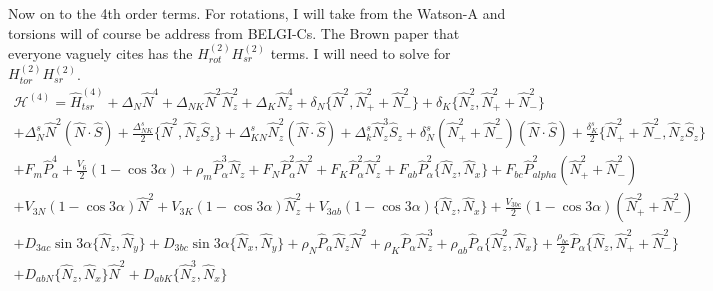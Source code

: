 \documentclass{article}
\begin{document}
Now on to the 4th order terms. 
For rotations, I will take from the Watson-A and torsions will of course be address from BELGI-Cs. 
The Brown paper that everyone vaguely cites has the $H_{rot}^{(2)}H_{sr}^{(2)}$ terms. 
I will need to solve for $H_{tor}^{(2)}H_{sr}^{(2)}$.\vspace{12pt}
\begin{multline}
\mathscr{H}^{(4)} = \hat{H}_{tsr}^{(4)} + \Delta_{N}\hat{N}^{4} + \Delta_{NK}\hat{N}^{2}\hat{N}_{z}^{2} + \Delta_{K}\hat{N}_{z}^{4} 
+ \delta_{N}\{\hat{N}^{2},\hat{N}_{+}^{2}+\hat{N}_{-}^{2}\}+ \delta_{K}\{\hat{N}_{z}^{2},\hat{N}_{+}^{2}+\hat{N}_{-}^{2}\}\\
+ \Delta^{s}_{N}\hat{N}^{2}(\hat{N}\cdot\hat{S}) + \frac{\Delta_{NK}^{s}}{2}\{\hat{N}^{2},\hat{N}_{z}\hat{S}_{z}\} + \Delta_{KN}^{s}\hat{N}_{z}^{2}(\hat{N}\cdot\hat{S}) 
+ \Delta_{k}^{s}\hat{N}^{3}_{z}\hat{S}_{z} + \delta^{s}_{N}(\hat{N}_{+}^{2}+\hat{N}_{-}^{2})(\hat{N}\cdot\hat{S})
+ \frac{\delta^{s}_{K}}{2}\{\hat{N}_{+}^{2}+\hat{N}_{-}^{2},\hat{N}_{z}\hat{S}_{z}\} \\
+ F_{m}\hat{P}_{\alpha}^{4} + \frac{V_{6}}{2}(1-\cos3\alpha) + \rho_{m}\hat{P}_{\alpha}^{3}\hat{N}_{z}
+ F_{N}\hat{P}_{\alpha}^{2}\hat{N}^{2}  
+ F_{K}\hat{P}_{\alpha}^{2}\hat{N}_{z}^{2} + F_{ab}\hat{P}^{2}_{\alpha}\{\hat{N}_{z},\hat{N}_{x}\} + F_{bc}\hat{P}_{alpha}^{2}(\hat{N}_{+}^{2}+\hat{N}_{-}^{2})\\
+ V_{3N}(1-\cos3\alpha)\hat{N}^{2} + V_{3K}(1-\cos3\alpha)\hat{N}_{z}^{2} 
+ V_{3ab}(1-\cos3\alpha)\{\hat{N}_{z},\hat{N}_{x}\} +  \frac{V_{3bc}}{2}(1-\cos3\alpha)(\hat{N}_{+}^{2}+\hat{N}_{-}^{2}) \\
+ D_{3ac}\sin3\alpha\{\hat{N}_{z},\hat{N}_{y}\} + D_{3bc}\sin3\alpha\{\hat{N}_{x},\hat{N}_{y}\} + \rho_{N}\hat{P}_{\alpha}\hat{N}_{z}\hat{N}^{2}
+\rho_{K}\hat{P}_{\alpha}\hat{N}_{z}^{3} + \rho_{ab}\hat{P}_{\alpha}\{\hat{N}_{z}^{2},\hat{N}_{x}\} + \frac{\rho_{bc}}{2}\hat{P}_{\alpha}\{\hat{N}_{z},\hat{N}_{+}^{2}+\hat{N}_{-}^{2}\}\\
+ D_{abN}\{\hat{N}_{z},\hat{N}_{x}\}\hat{N}^{2} + D_{abK}\{\hat{N}_{z}^{3},\hat{N}_{x}\}
\end{multline}
\end{document}
